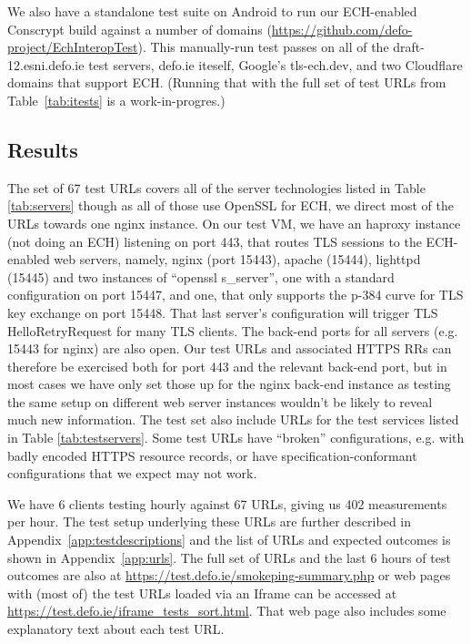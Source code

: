 We also have a standalone test suite on Android to run our ECH-enabled
Conscrypt build against a number of domains
(\url{https://github.com/defo-project/EchInteropTest}).  This manually-run test
passes on all of the draft-12.esni.defo.ie test servers, defo.ie iteself,
Google's tls-ech.dev, and two Cloudflare domains that support ECH. (Running
that with the full set of test URLs from Table~\ref{tab:itests} is a
work-in-progres.)

\subsection{Results}

The set of 67 test URLs covers all of the server technologies listed in Table
\ref{tab:servers} though as all of those use OpenSSL for ECH, we direct most
of the URLs towards one nginx instance. On our test VM, we have an haproxy
instance (not doing an ECH) listening on port 443, that routes TLS sessions to
the ECH-enabled web servers, namely, nginx (port 15443), apache (15444),
lighttpd (15445) and two instances of ``openssl s\_server'', one with a
standard configuration on port 15447, and one, that only supports the p-384
curve for TLS key exchange on port 15448. That last server's configuration will
trigger TLS HelloRetryRequest for many TLS clients. The back-end ports for all
servers (e.g. 15443 for nginx) are also open. Our test URLs and associated
HTTPS RRs can therefore be exercised both for port 443 and the relevant
back-end port, but in most cases we have only set those up for the nginx
back-end instance as testing the same setup on different web server instances
wouldn't be likely to reveal much new information.  The test set also include
URLs for the test services listed in Table \ref{tab:testservers}.  Some test
URLs have ``broken'' configurations, e.g. with badly encoded HTTPS resource
records, or have specification-conformant configurations that we expect may not
work.

We have 6 clients testing hourly against 67 URLs, giving us 402 measurements
per hour. The test setup underlying these URLs are further described in
Appendix~\ref{app:testdescriptions} and the list of URLs and expected outcomes
is shown in Appendix~\ref{app:urls}.  The full set of URLs and the last 6 hours
of test outcomes are also at \url{https://test.defo.ie/smokeping-summary.php}
or web pages with (most of) the test URLs loaded via an Iframe can be accessed
at \url{https://test.defo.ie/iframe_tests_sort.html}. That web page also
includes some explanatory text about each test URL.


